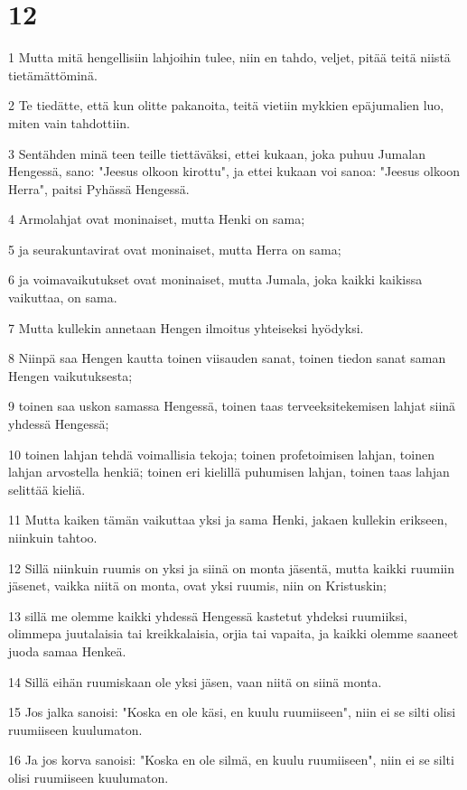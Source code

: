 \chapter{12}

\par 1 Mutta mitä hengellisiin lahjoihin tulee, niin en tahdo, veljet, pitää teitä niistä tietämättöminä.
\par 2 Te tiedätte, että kun olitte pakanoita, teitä vietiin mykkien epäjumalien luo, miten vain tahdottiin.
\par 3 Sentähden minä teen teille tiettäväksi, ettei kukaan, joka puhuu Jumalan Hengessä, sano: "Jeesus olkoon kirottu", ja ettei kukaan voi sanoa: "Jeesus olkoon Herra", paitsi Pyhässä Hengessä.
\par 4 Armolahjat ovat moninaiset, mutta Henki on sama;
\par 5 ja seurakuntavirat ovat moninaiset, mutta Herra on sama;
\par 6 ja voimavaikutukset ovat moninaiset, mutta Jumala, joka kaikki kaikissa vaikuttaa, on sama.
\par 7 Mutta kullekin annetaan Hengen ilmoitus yhteiseksi hyödyksi.
\par 8 Niinpä saa Hengen kautta toinen viisauden sanat, toinen tiedon sanat saman Hengen vaikutuksesta;
\par 9 toinen saa uskon samassa Hengessä, toinen taas terveeksitekemisen lahjat siinä yhdessä Hengessä;
\par 10 toinen lahjan tehdä voimallisia tekoja; toinen profetoimisen lahjan, toinen lahjan arvostella henkiä; toinen eri kielillä puhumisen lahjan, toinen taas lahjan selittää kieliä.
\par 11 Mutta kaiken tämän vaikuttaa yksi ja sama Henki, jakaen kullekin erikseen, niinkuin tahtoo.
\par 12 Sillä niinkuin ruumis on yksi ja siinä on monta jäsentä, mutta kaikki ruumiin jäsenet, vaikka niitä on monta, ovat yksi ruumis, niin on Kristuskin;
\par 13 sillä me olemme kaikki yhdessä Hengessä kastetut yhdeksi ruumiiksi, olimmepa juutalaisia tai kreikkalaisia, orjia tai vapaita, ja kaikki olemme saaneet juoda samaa Henkeä.
\par 14 Sillä eihän ruumiskaan ole yksi jäsen, vaan niitä on siinä monta.
\par 15 Jos jalka sanoisi: "Koska en ole käsi, en kuulu ruumiiseen", niin ei se silti olisi ruumiiseen kuulumaton.
\par 16 Ja jos korva sanoisi: "Koska en ole silmä, en kuulu ruumiiseen", niin ei se silti olisi ruumiiseen kuulumaton.

